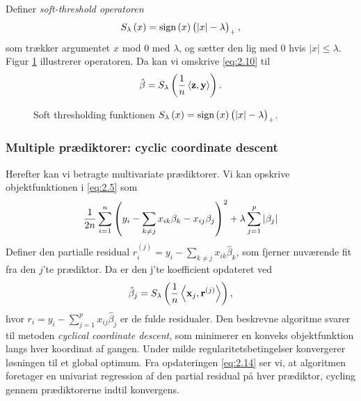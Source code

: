 Definer \textit{soft-threshold operatoren}
\begin{align*}
S_\lambda\del{x}=\text{sign}\del{x} \del{\vert x \vert - \lambda}_+,
\end{align*}
som trækker argumentet $x$ mod 0 med $\lambda$, og sætter den lig med 0 hvis $\vert x \vert \leq \lambda$. 
Figur \ref{fig:soft_thresholding_fct} illustrerer operatoren.
Da kan vi omskrive \eqref{eq:2.10} til
\begin{align*}
\hat{\beta} = S_\lambda \del{\frac{1}{n} \left\langle \mathbf{z}, \mathbf{y} \right\rangle}.
\end{align*}
%
\begin{figure}[H]
\centering
\scalebox{0.8}{}
\caption[optional short text]{Soft thresholding funktionen $S_\lambda\del{x}=\text{sign}\del{x} \del{\vert x \vert - \lambda}_+$.} \label{fig:soft_thresholding_fct}
\end{figure}
%
\subsubsection{Multiple prædiktorer: cyclic coordinate descent}
Herefter kan vi betragte multivariate prædiktorer. 
Vi kan opskrive objektfunktionen i \eqref{eq:2.5} som
\begin{align*}
\frac{1}{2n} \sum_{i=1}^n \del{y_i - \sum_{k \neq j} x_{ik} \beta_k - x_{ij} \beta_j}^2 + \lambda \sum_{j = 1}^p \vert \beta_j \vert
\end{align*}
Definer den partialle residual $r_i^{(j)}=y_i - \sum_{k \neq j} x_{ik} \hat{\beta}_k$, som fjerner nuværende fit fra den $j$'te prædiktor.
Da er den j'te koefficient opdateret ved
\begin{align}
\hat{\beta}_j = S_\lambda \del{\frac{1}{n} \left\langle \mathbf{x}_j, \mathbf{r}^{(j)} \right\rangle}, \label{eq:2.14}
\end{align}
hvor \(r_i = y_i - \sum_{j = 1}^p x_{ij} \hat{\beta}_j \) er de fulde residualer.
Den beskrevne algoritme svarer til metoden \textit{cyclical coordinate descent}, som minimerer en konveks objektfunktion langs hver koordinat af gangen.
Under milde regularitetsbetingelser konvergerer løsningen til et global optimum.
Fra opdateringen \eqref{eq:2.14} ser vi, at algoritmen foretager en univariat regression af den partial residual på hver prædiktor, cycling gennem prædiktorerne indtil konvergens.

